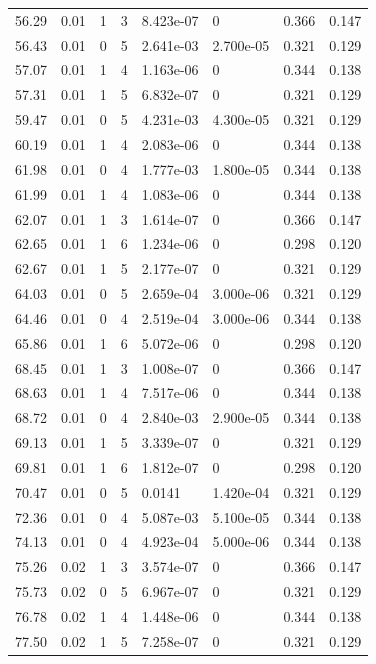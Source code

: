 \documentclass[preview]{standalone}
\begin{document}
{{{\begin{tabular}{L{1.2cm}C{1.2cm} C{0.3cm}C{0.5cm} C{1.4cm}C{1.4cm} C{1.4cm}C{1.4cm}}
  56.29  &  0.01  & 1     &  3 &  8.423e-07  & 0  & 0.366 &  0.147   \\ 
  56.43  &  0.01  & 0     &  5 &  2.641e-03  & 2.700e-05  & 0.321 &  0.129   \\ 
  57.07  &  0.01  & 1     &  4 &  1.163e-06  & 0  & 0.344 &  0.138   \\ 
  57.31  &  0.01  & 1     &  5 &  6.832e-07  & 0  & 0.321 &  0.129   \\ 
  59.47  &  0.01  & 0     &  5 &  4.231e-03  & 4.300e-05  & 0.321 &  0.129   \\ 
  60.19  &  0.01  & 1     &  4 &  2.083e-06  & 0  & 0.344 &  0.138   \\ 
  61.98  &  0.01  & 0     &  4 &  1.777e-03  & 1.800e-05  & 0.344 &  0.138   \\ 
  61.99  &  0.01  & 1     &  4 &  1.083e-06  & 0  & 0.344 &  0.138   \\ 
  62.07  &  0.01  & 1     &  3 &  1.614e-07  & 0  & 0.366 &  0.147   \\ 
  62.65  &  0.01  & 1     &  6 &  1.234e-06  & 0  & 0.298 &  0.120   \\ 
  62.67  &  0.01  & 1     &  5 &  2.177e-07  & 0  & 0.321 &  0.129   \\ 
  64.03  &  0.01  & 0     &  5 &  2.659e-04  & 3.000e-06  & 0.321 &  0.129   \\ 
  64.46  &  0.01  & 0     &  4 &  2.519e-04  & 3.000e-06  & 0.344 &  0.138   \\ 
  65.86  &  0.01  & 1     &  6 &  5.072e-06  & 0  & 0.298 &  0.120   \\ 
  68.45  &  0.01  & 1     &  3 &  1.008e-07  & 0  & 0.366 &  0.147   \\ 
  68.63  &  0.01  & 1     &  4 &  7.517e-06  & 0  & 0.344 &  0.138   \\ 
  68.72  &  0.01  & 0     &  4 &  2.840e-03  & 2.900e-05  & 0.344 &  0.138   \\ 
  69.13  &  0.01  & 1     &  5 &  3.339e-07  & 0  & 0.321 &  0.129   \\ 
  69.81  &  0.01  & 1     &  6 &  1.812e-07  & 0  & 0.298 &  0.120   \\ 
  70.47  &  0.01  & 0     &  5 &  0.0141  & 1.420e-04  & 0.321 &  0.129   \\ 
  72.36  &  0.01  & 0     &  4 &  5.087e-03  & 5.100e-05  & 0.344 &  0.138   \\ 
  74.13  &  0.01  & 0     &  4 &  4.923e-04  & 5.000e-06  & 0.344 &  0.138   \\ 
  75.26  &  0.02  & 1     &  3 &  3.574e-07  & 0  & 0.366 &  0.147   \\ 
  75.73  &  0.02  & 0     &  5 &  6.967e-07  & 0  & 0.321 &  0.129   \\ 
  76.78  &  0.02  & 1     &  4 &  1.448e-06  & 0  & 0.344 &  0.138   \\ 
  77.50  &  0.02  & 1     &  5 &  7.258e-07  & 0  & 0.321 &  0.129   \\ 
\hline 
\end{tabular} 

}}}
\end{document}
